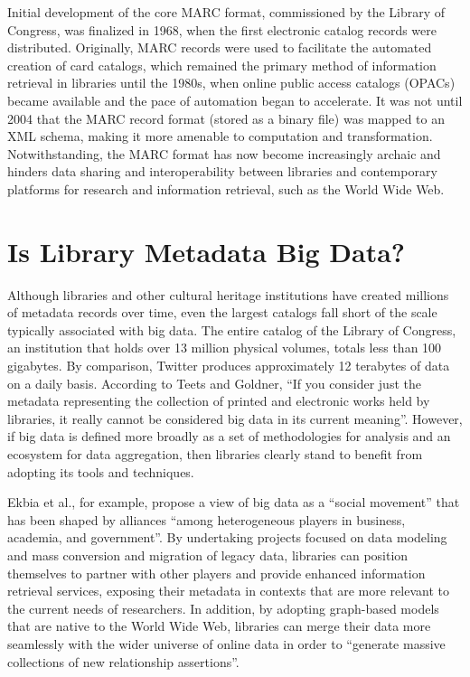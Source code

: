 \documentclass[sigconf]{acmart}
\begin{document}
Initial development of the core MARC format, commissioned by the Library of Congress, was finalized in 1968, when the first electronic catalog records were distributed\cite{kF12}. Originally, MARC records were used to facilitate the automated creation of card catalogs, which remained the primary method of information retrieval in libraries until the 1980s, when online public access catalogs (OPACs) became available and the pace of automation began to accelerate\cite{mT13}. It was not until 2004 that the MARC record format (stored as a binary file) was mapped to an XML schema, making it more amenable to computation and transformation\cite{mX04}. Notwithstanding, the MARC format has now become increasingly archaic and hinders data sharing and interoperability between libraries and contemporary platforms for research and information retrieval, such as the World Wide Web.

\section{Is Library Metadata Big Data?}
Although libraries and other cultural heritage institutions have created millions of metadata records over time, even the largest catalogs fall short of the scale typically associated with big data. The entire catalog of the Library of Congress, an institution that holds over 13 million physical volumes, totals less than 100 gigabytes. By comparison, Twitter produces approximately 12 terabytes of data on a daily basis\cite[p.~1527]{hE15}. According to Teets and Goldner, ``If you consider just the metadata representing the collection of printed and electronic works held by libraries, it really cannot be considered big data in its current meaning''\cite{mT13}. However, if big data is defined more broadly as a set of methodologies for analysis and an ecosystem for data aggregation, then libraries clearly stand to benefit from adopting its tools and techniques. 

Ekbia et al., for example, propose a view of big data as a ``social movement'' that has been shaped by alliances ``among heterogeneous players in business, academia, and government''\cite[p.~1527]{hE15}. By undertaking projects focused on data modeling and mass conversion and migration of legacy data, libraries can position themselves to partner with other players and provide enhanced information retrieval services, exposing their metadata in contexts that are more relevant to the current needs of researchers. In addition, by adopting graph-based models that are native to the World Wide Web, libraries can merge their data more seamlessly with the wider universe of online data in order to ``generate massive collections of new relationship assertions''\cite{mT13}. 
\end{document}
